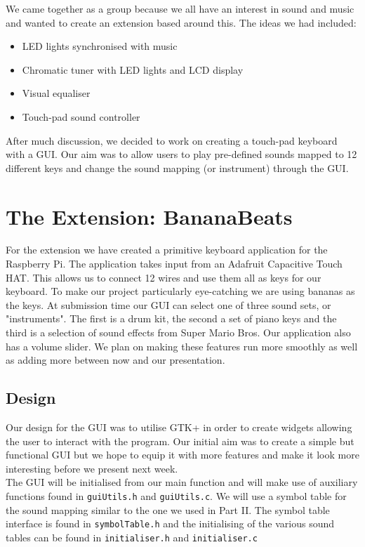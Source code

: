 \documentclass[11pt]{article}
\begin{document}
We came together as a group because we all have an interest in sound and music and wanted to create an extension based around this. The ideas we had included:
\begin{itemize}
\item LED lights synchronised with music
\item Chromatic tuner with LED lights and LCD display
\item Visual equaliser 
\item Touch-pad sound controller 
\end{itemize}

After much discussion, we decided to work on creating a touch-pad keyboard with a GUI. Our aim was to allow users to play pre-defined sounds mapped to 12 different keys and change the sound mapping (or instrument) through the GUI.

\section{The Extension: BananaBeats}
For the extension we have created a primitive keyboard application for the Raspberry Pi. The application takes input from an Adafruit Capacitive Touch HAT. This allows us to connect 12 wires and use them all as keys for our keyboard. To make our project particularly eye-catching we are using bananas as the keys. At submission time our GUI can select one of three sound sets, or "instruments". The first is a drum kit, the second a set of piano keys and the third is a selection of sound effects from Super Mario Bros. Our application also has a volume slider. We plan on making these features run more smoothly as well as adding more between now and our presentation.

\subsection{Design}
	Our design for the GUI was to utilise GTK+ in order to create widgets allowing the user to interact with the program. Our initial aim was to create a simple but functional GUI but we hope to equip it with more features and make it look more interesting before we present next week. 
	\\
	
	The GUI will be initialised from our main function and will make use of auxiliary functions found in \texttt{guiUtils.h} and \texttt{guiUtils.c}. We will use a symbol table for the sound mapping similar to the one we used in Part II. The symbol table interface is found in \texttt{symbolTable.h} and the initialising of the various sound tables can be found in \texttt{initialiser.h} and \texttt{initialiser.c}
\end{document}
